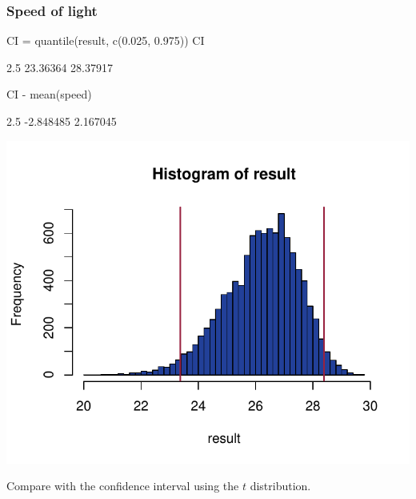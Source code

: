 \documentclass[a4paper]{article}\usepackage[]{graphicx}\usepackage[]{xcolor}
\makeatletter
\def\maxwidth{ %
  \ifdim\Gin@nat@width>\linewidth
    \linewidth
  \else
    \Gin@nat@width
  \fi
}
\makeatother
\begin{document}
\subsubsection{Speed of light}
\begin{Schunk}
\begin{Sinput}
CI = quantile(result, c(0.025, 0.975))
CI
\end{Sinput}
\begin{Soutput}
    2.5%
23.36364 28.37917 
\end{Soutput}
\begin{Sinput}
CI - mean(speed)
\end{Sinput}
\begin{Soutput}
     2.5%
-2.848485  2.167045 
\end{Soutput}


{\centering \includegraphics[width=\maxwidth]{figure/listings-unnamed-chunk-168-1} 

}

\end{Schunk}
Compare with the confidence interval using the \( t \) distribution.
\end{document}
